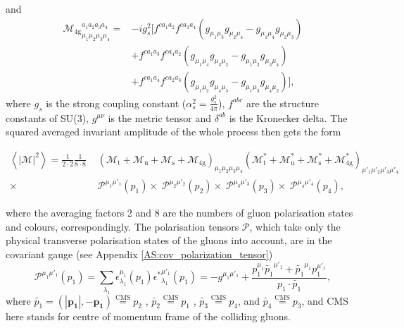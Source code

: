 \documentclass[a4paper, twoside, english, 12pt]{report}
\begin{document}
and
\begin{align*}
{\mathcal{M}_\text{4g}}_{\mu_1\mu_2\mu_3\mu_4}^{a_1a_2a_3a_4} = &-ig_s^2\Big[f^{ca_1a_2}f^{ca_3a_4}( g_{\mu_1\mu_3}g_{\mu_2\mu_4} - g_{\mu_1\mu_4}g_{\mu_2\mu_3})\\
&+ f^{ca_1a_3}f^{ca_4a_2}( g_{\mu_1\mu_4}g_{\mu_3\mu_2} - g_{\mu_1\mu_2}g_{\mu_3\mu_4}) \\ 
&+ f^{ca_1a_4}f^{ca_2a_3}( g_{\mu_1\mu_2}g_{\mu_4\mu_3} - g_{\mu_1\mu_3}g_{\mu_4\mu_2})\Big],
\end{align*}
where $g_s$ is the strong coupling constant ($\alpha_s^2 = \frac{g_s^2}{4\pi}$), $f^{abc}$ are the structure constants of SU(3), $g^{\mu\nu}$ is the metric tensor and $\delta^{ab}$ is the Kronecker delta. The squared averaged invariant amplitude of the whole process then gets the form

\begin{align}
\textstyle\left\langle|\mathcal{M}|^2\right\rangle = \frac{1}{2\cdot 2}\frac{1}{8\cdot 8}\,\,&\left(\mathcal{M}_\text{t}+\mathcal{M}_\text{u}+\mathcal{M}_\text{s}+\mathcal{M}_\text{4g}\right)_{\mu_1\mu_2\mu_3\mu_4}\left(\mathcal{M}_\text{t}^*+\mathcal{M}_\text{u}^*+\mathcal{M}_\text{s}^*+\mathcal{M}_\text{4g}^*\right)_{\mu'_1\mu'_2\mu'_3\mu'_4} \\\nonumber
\displaystyle\times\; & \mathcal{P}^{\mu_1^{ }\mu'_1} (p_1)  \times\; \mathcal{P}^{\mu_2^{ }\mu'_2} (p_2)  \times\; \mathcal{P}^{\mu_3^{ }\mu'_3} (p_3)  \times\; \mathcal{P}^{\mu_4^{ }\mu'_4} (p_4),
\end{align}

where the averaging factors 2 and 8 are the numbers of gluon polarisation states and colours, correspondingly. The polarisation tensors $\mathcal{P}$, which take only the physical transverse polarisation states of the gluons into account, are in the covariant gauge (see Appendix \ref{AS:cov_polarization_tensor}) \cite[ch. 5.3]{Peskin}\cite[ch. 16.1]{Sterman} 
\begin{equation}\label{E:ptensorcovariant}
\mathcal{P}^{\mu_1^{ }\mu'_1} (p_1) =\sum_{\lambda_1}\epsilon_{\lambda_1}^{\mu_1}(p_1) {\epsilon^*}_{\lambda_1}^{\mu'_1}(p_1) =  -g^{\mu_1^{ }\mu'_1} + \frac{p_1^{\mu_1^{ }}\tilde{p_1}^{\mu'_1}+\tilde{p_1}^{\mu_1^{ }}p_1^{\mu'_1}}{p_1\cdot\tilde{p_1}},
\end{equation}
where $\tilde{p_1}=(|\mathbf{p_1}|,-\mathbf{p_1})
\overset{\text{CMS}}{=}p_2$ , $\tilde{p_2}\overset{\text{CMS}}{=}p_1$ , $\tilde{p_3}\overset{\text{CMS}}{=}p_4$, and $\tilde{p_4}\overset{\text{CMS}}{=}p_3$, and CMS here stands for centre of momentum frame of the colliding gluons.
\end{document}
